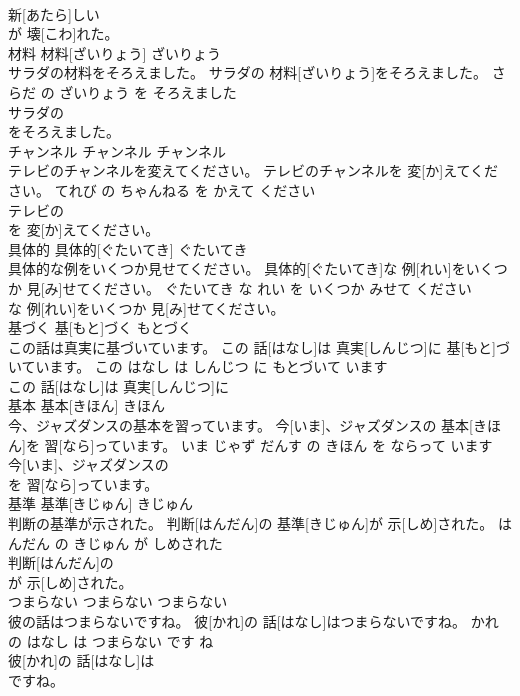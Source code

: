 \documentclass[8pt]{extreport}
\begin{document}
\begin{CJK}{UTF8}{min}
\\	新[あたら]しい
\\	が 壊[こわ]れた。		
\\	材料	材料[ざいりょう]	ざいりょう	
\\	サラダの材料をそろえました。	サラダの 材料[ざいりょう]をそろえました。	さらだ の ざいりょう を そろえました	
\\	サラダの
\\	をそろえました。		
\\	チャンネル	チャンネル	チャンネル	
\\	テレビのチャンネルを変えてください。	テレビのチャンネルを 変[か]えてください。	てれび の ちゃんねる を かえて ください	
\\	テレビの
\\	を 変[か]えてください。		
\\	具体的	具体的[ぐたいてき]	ぐたいてき	
\\	具体的な例をいくつか見せてください。	具体的[ぐたいてき]な 例[れい]をいくつか 見[み]せてください。	ぐたいてき な れい を いくつか みせて ください	
\\	な 例[れい]をいくつか 見[み]せてください。		
\\	基づく	基[もと]づく	もとづく	
\\	この話は真実に基づいています。	この 話[はなし]は 真実[しんじつ]に 基[もと]づいています。	この はなし は しんじつ に もとづいて います	
\\	この 話[はなし]は 真実[しんじつ]に
\\	基本	基本[きほん]	きほん	
\\	今、ジャズダンスの基本を習っています。	今[いま]、ジャズダンスの 基本[きほん]を 習[なら]っています。	いま じゃず だんす の きほん を ならって います	
\\	今[いま]、ジャズダンスの
\\	を 習[なら]っています。		
\\	基準	基準[きじゅん]	きじゅん	
\\	判断の基準が示された。	判断[はんだん]の 基準[きじゅん]が 示[しめ]された。	はんだん の きじゅん が しめされた	
\\	判断[はんだん]の
\\	が 示[しめ]された。		
\\	つまらない	つまらない	つまらない	
\\	彼の話はつまらないですね。	彼[かれ]の 話[はなし]はつまらないですね。	かれ の はなし は つまらない です ね	
\\	彼[かれ]の 話[はなし]は
\\	ですね。		

\end{CJK}
\end{document}
